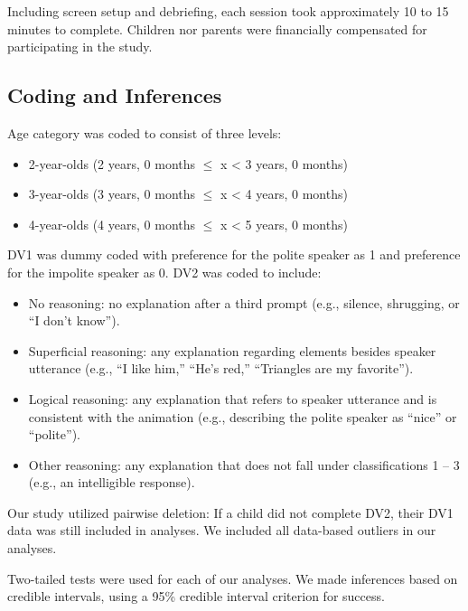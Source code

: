 \documentclass[
  english,
  man,floatsintext]{apa6}
\begin{document}
Including screen setup and debriefing, each session took approximately 10 to 15 minutes to complete. Children nor parents were financially compensated for participating in the study.

\hypertarget{coding-and-inferences}{%
\subsection{Coding and Inferences}\label{coding-and-inferences}}

Age category was coded to consist of three levels:

\begin{itemize}
\item
  2-year-olds (2 years, 0 months \(\leqslant\) x \textless{} 3 years, 0 months)
\item
  3-year-olds (3 years, 0 months \(\leqslant\) x \textless{} 4 years, 0 months)
\item
  4-year-olds (4 years, 0 months \(\leqslant\) x \textless{} 5 years, 0 months)
\end{itemize}

DV1 was dummy coded with preference for the polite speaker as 1 and preference for the impolite speaker as 0. DV2 was coded to include:

\begin{itemize}
\item
  No reasoning: no explanation after a third prompt (e.g., silence, shrugging, or ``I don't know'').
\item
  Superficial reasoning: any explanation regarding elements besides speaker utterance (e.g., ``I like him,'' ``He's red,'' ``Triangles are my favorite'').
\item
  Logical reasoning: any explanation that refers to speaker utterance and is consistent with the animation (e.g., describing the polite speaker as ``nice'' or ``polite'').
\item
  Other reasoning: any explanation that does not fall under classifications 1 -- 3 (e.g., an intelligible response).
\end{itemize}

Our study utilized pairwise deletion: If a child did not complete DV2, their DV1 data was still included in analyses. We included all data-based outliers in our analyses.

Two-tailed tests were used for each of our analyses. We made inferences based on credible intervals, using a 95\% credible interval criterion for success.
\end{document}
